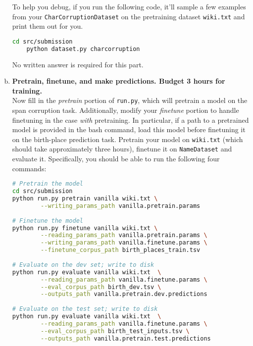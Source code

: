 \begin{enumerate}[(a)]
To help you debug, if you run the following code, it'll sample a few examples from your \texttt{CharCorruptionDataset} on the pretraining dataset \texttt{wiki.txt} and print them out for you.
\begin{lstlisting}[language=bash]
    cd src/submission
    python dataset.py charcorruption
\end{lstlisting}

No written answer is required for this part.

\item {} \textbf{Pretrain, finetune, and make predictions. Budget 3 hours for training.}\\
Now fill in the \textit{pretrain} portion of \texttt{run.py}, which will pretrain a model on the span corruption task. Additionally, modify your \textit{finetune} portion to handle finetuning in the case \textit{with} pretraining. In particular, if a path to a pretrained model is provided in the bash command, load this model before finetuning it on the birth-place prediction task.
Pretrain your model on \texttt{wiki.txt} (which should take approximately three hours), finetune it on \texttt{NameDataset} and evaluate it. Specifically, you should be able to run the following four commands:

\begin{lstlisting}[language=bash]
# Pretrain the model
cd src/submission
python run.py pretrain vanilla wiki.txt \
        --writing_params_path vanilla.pretrain.params
        
# Finetune the model
python run.py finetune vanilla wiki.txt \
        --reading_params_path vanilla.pretrain.params \
        --writing_params_path vanilla.finetune.params \
        --finetune_corpus_path birth_places_train.tsv
        
# Evaluate on the dev set; write to disk
python run.py evaluate vanilla wiki.txt  \
        --reading_params_path vanilla.finetune.params \
        --eval_corpus_path birth_dev.tsv \
        --outputs_path vanilla.pretrain.dev.predictions
        
# Evaluate on the test set; write to disk
python run.py evaluate vanilla wiki.txt  \
        --reading_params_path vanilla.finetune.params \
        --eval_corpus_path birth_test_inputs.tsv \
        --outputs_path vanilla.pretrain.test.predictions
\end{lstlisting}


\end{enumerate}
